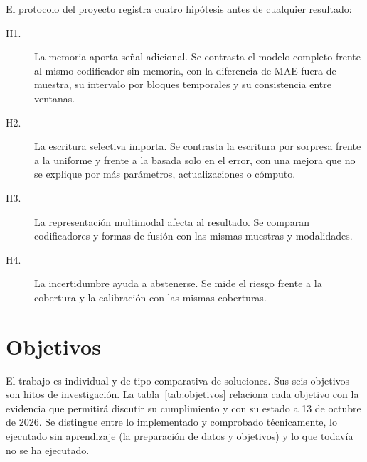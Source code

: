 \documentclass[11pt,a4paper]{report}
\begin{document}
El protocolo del proyecto registra cuatro hipótesis antes de cualquier
resultado:
\begin{description}
\item[H1.] La memoria aporta señal adicional. Se contrasta el modelo completo
frente al mismo codificador sin memoria, con la diferencia de MAE fuera de
muestra, su intervalo por bloques temporales y su consistencia entre ventanas.
\item[H2.] La escritura selectiva importa. Se contrasta la escritura por
sorpresa frente a la uniforme y frente a la basada solo en el error, con una
mejora que no se explique por más parámetros, actualizaciones o cómputo.
\item[H3.] La representación multimodal afecta al resultado. Se comparan
codificadores y formas de fusión con las mismas muestras y modalidades.
\item[H4.] La incertidumbre ayuda a abstenerse. Se mide el riesgo frente a la
cobertura y la calibración con las mismas coberturas.
\end{description}

\section{Objetivos}
El trabajo es individual y de tipo comparativa de soluciones. Sus seis
objetivos son hitos de investigación. La tabla~\ref{tab:objetivos} relaciona
cada objetivo con la evidencia que permitirá discutir su cumplimiento y con su
estado a 13 de octubre de 2026. Se distingue entre lo implementado y
comprobado técnicamente, lo ejecutado sin aprendizaje (la preparación de datos
y objetivos) y lo que todavía no se ha ejecutado.
\end{document}
